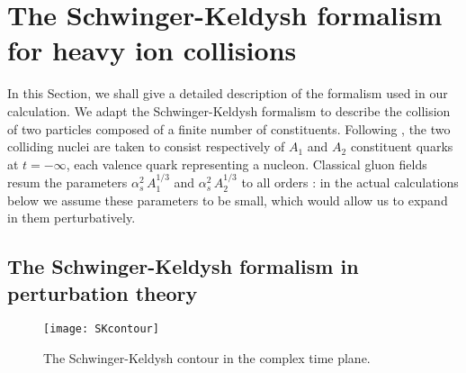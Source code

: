 \documentclass[onecolumn,showpacs,nobibnotes,nofootinbib,12pt,aps,prd,showpacs,notitlepage,nofootinbib,preprintnumbers,amsmath,amssymb]{article}
\newcommand{\as}{\alpha_s}
\begin{document}

\section{The Schwinger-Keldysh formalism for heavy ion collisions}


\label{sec:sk}

In this Section, we shall give a detailed description of the formalism
used in our calculation. We adapt the Schwinger-Keldysh formalism
\cite{Schwinger:1960qe,Keldysh:1964ud} to describe the collision of
two particles composed of a finite number of constituents. Following
\cite{Mueller:1989st,McLerran:1993ni,McLerran:1993ka,Kovchegov:1996ty},
the two colliding nuclei are taken to consist respectively of $A_{1}$
and $A_{2}$ constituent quarks at $t=-\infty$, each valence quark
representing a nucleon. Classical gluon fields resum the parameters
$\as^2 \, A_1^{1/3}$ and $\as^2 \, A_2^{1/3}$ to all orders
\cite{Kovchegov:1997pc}: in the actual calculations below we assume
these parameters to be small, which would allow us to expand in them
perturbatively.



\subsection{The Schwinger-Keldysh formalism in perturbation theory}

\begin{figure}
\begin{center}
\texttt{[image: SKcontour]}
\end{center}
\caption{The Schwinger-Keldysh contour in the complex time plane.}
\label{fig:SKcontour}
\end{figure}
\end{document}
